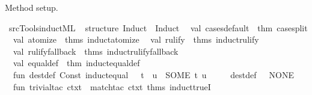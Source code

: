 \begin{isabellebody}
\endisatagproof
{\isafoldproof}%
%
\isadelimproof
%
\endisadelimproof
%
\begin{isamarkuptext}%
Method setup.%
\end{isamarkuptext}\isamarkuptrue%
%
\isadelimML
%
\endisadelimML
%
\isatagML
{}\isamarkupfalse%
\ {\isacartoucheopen}{\isachartilde}{\kern0pt}{\isachartilde}{\kern0pt}{\isacharslash}{\kern0pt}src{\isacharslash}{\kern0pt}Tools{\isacharslash}{\kern0pt}induct{\isachardot}{\kern0pt}ML{\isacartoucheclose}\isanewline
{}\isamarkupfalse%
\ {\isacartoucheopen}\isanewline
structure\ Induct\ {\isacharequal}{\kern0pt}\ Induct\isanewline
{\isacharparenleft}{\kern0pt}\isanewline
\ \ val\ cases{\isacharunderscore}{\kern0pt}default\ {\isacharequal}{\kern0pt}\ {\isacharat}{\kern0pt}{\isacharbraceleft}{\kern0pt}thm\ case{\isacharunderscore}{\kern0pt}split{\isacharbraceright}{\kern0pt}\isanewline
\ \ val\ atomize\ {\isacharequal}{\kern0pt}\ {\isacharat}{\kern0pt}{\isacharbraceleft}{\kern0pt}thms\ induct{\isacharunderscore}{\kern0pt}atomize{\isacharbraceright}{\kern0pt}\isanewline
\ \ val\ rulify\ {\isacharequal}{\kern0pt}\ {\isacharat}{\kern0pt}{\isacharbraceleft}{\kern0pt}thms\ induct{\isacharunderscore}{\kern0pt}rulify{\isacharprime}{\kern0pt}{\isacharbraceright}{\kern0pt}\isanewline
\ \ val\ rulify{\isacharunderscore}{\kern0pt}fallback\ {\isacharequal}{\kern0pt}\ {\isacharat}{\kern0pt}{\isacharbraceleft}{\kern0pt}thms\ induct{\isacharunderscore}{\kern0pt}rulify{\isacharunderscore}{\kern0pt}fallback{\isacharbraceright}{\kern0pt}\isanewline
\ \ val\ equal{\isacharunderscore}{\kern0pt}def\ {\isacharequal}{\kern0pt}\ {\isacharat}{\kern0pt}{\isacharbraceleft}{\kern0pt}thm\ induct{\isacharunderscore}{\kern0pt}equal{\isacharunderscore}{\kern0pt}def{\isacharbraceright}{\kern0pt}\isanewline
\ \ fun\ dest{\isacharunderscore}{\kern0pt}def\ {\isacharparenleft}{\kern0pt}Const\ {\isacharparenleft}{\kern0pt}\isactrlconstUNDERSCOREname {\isasymopen}induct{\isacharunderscore}{\kern0pt}equal{\isasymclose}{\isacharcomma}{\kern0pt}\ {\isacharunderscore}{\kern0pt}{\isacharparenright}{\kern0pt}\ {\isachardollar}{\kern0pt}\ t\ {\isachardollar}{\kern0pt}\ u{\isacharparenright}{\kern0pt}\ {\isacharequal}{\kern0pt}\ SOME\ {\isacharparenleft}{\kern0pt}t{\isacharcomma}{\kern0pt}\ u{\isacharparenright}{\kern0pt}\isanewline
\ \ \ \ {\isacharbar}{\kern0pt}\ dest{\isacharunderscore}{\kern0pt}def\ {\isacharunderscore}{\kern0pt}\ {\isacharequal}{\kern0pt}\ NONE\isanewline
\ \ fun\ trivial{\isacharunderscore}{\kern0pt}tac\ ctxt\ {\isacharequal}{\kern0pt}\ match{\isacharunderscore}{\kern0pt}tac\ ctxt\ {\isacharat}{\kern0pt}{\isacharbraceleft}{\kern0pt}thms\ induct{\isacharunderscore}{\kern0pt}trueI{\isacharbraceright}{\kern0pt}\isanewline

\end{isabellebody}
